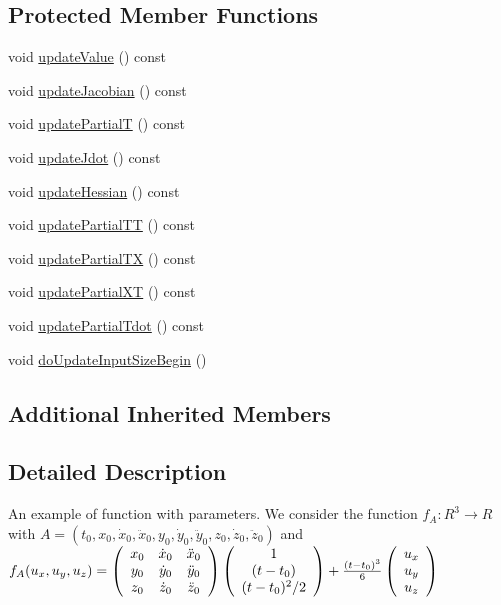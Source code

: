 \subsection*{Protected Member Functions}
\begin{DoxyCompactItemize}
\item 
void \hyperlink{classFunction3_ab68741903d2a396107e0a852f71a2ab6}{update\+Value} () const 
\item 
void \hyperlink{classFunction3_ac5520c70404c7e14aa9aaea122e8aa92}{update\+Jacobian} () const 
\item 
void \hyperlink{classFunction3_a783737c9e90a2428fa85f07301579c4e}{update\+PartialT} () const 
\item 
void \hyperlink{classFunction3_a944793157aea306b37cbc645b9b35343}{update\+Jdot} () const 
\item 
void \hyperlink{classFunction3_a6ce81af5a5430db02e582f51c1aa16ca}{update\+Hessian} () const 
\item 
void \hyperlink{classFunction3_adf1fe58eb49921b7d131edfb58edeeec}{update\+Partial\+TT} () const 
\item 
void \hyperlink{classFunction3_a49d40175a7a4ff33ca2015377254b473}{update\+Partial\+TX} () const 
\item 
void \hyperlink{classFunction3_a58cbd578947aca5234d62474ef703d8a}{update\+Partial\+XT} () const 
\item 
void \hyperlink{classFunction3_af3070d9ce901ec7fa3fe5a35e6fd1411}{update\+Partial\+Tdot} () const 
\item 
void \hyperlink{classFunction3_a00a1ea6f2a0fdc5df66004e23038fff0}{do\+Update\+Input\+Size\+Begin} ()
\end{DoxyCompactItemize}
\subsection*{Additional Inherited Members}


\subsection{Detailed Description}
An example of function with parameters. We consider the function $ f_A:R^3 \rightarrow R $ with $ A = \left(t_0, x_0, \dot{x}_0, \ddot{x}_0, y_0, \dot{y}_0, \ddot{y}_0, z_0, \dot{z}_0, \ddot{z}_0 \right) $ and $ f_A(u_x,u_y,u_z) = \left(\begin{array}{c c c} x_0 & \dot{x}_0 & \ddot{x}_0 \\ y_0 & \dot{y}_0 & \ddot{y}_0 \\ z_0 & \dot{z}_0 & \ddot{z}_0 \end{array}\right) \left(\begin{array}{c} 1 \\ (t-t_0) \\ (t-t_0)^2/2 \end{array}\right) + \frac{(t-t_0)^3}{6} \left(\begin{array}{c} u_x \\ u_y \\ u_z \end{array}\right) $ 

